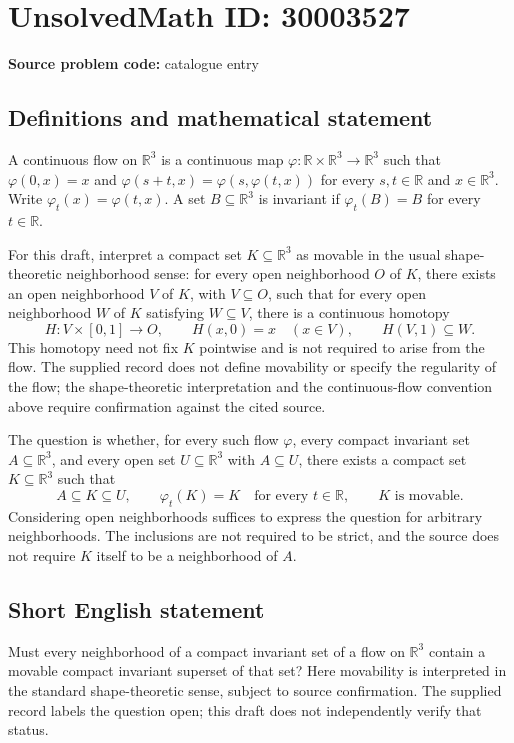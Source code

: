 \documentclass[11pt]{article}
\newcommand{\R}{\mathbb{R}}
\begin{document}
\section*{UnsolvedMath ID: 30003527}
\textbf{Source problem code:} catalogue entry
\subsection{Definitions and mathematical statement}
A continuous flow on \(\R^3\) is a continuous map \(\varphi:\R\times\R^3\to\R^3\) such that \(\varphi(0,x)=x\) and \(\varphi(s+t,x)=\varphi(s,\varphi(t,x))\) for every \(s,t\in\R\) and \(x\in\R^3\). Write \(\varphi_t(x)=\varphi(t,x)\). A set \(B\subseteq\R^3\) is invariant if \(\varphi_t(B)=B\) for every \(t\in\R\).

For this draft, interpret a compact set \(K\subseteq\R^3\) as movable in the usual shape-theoretic neighborhood sense: for every open neighborhood \(O\) of \(K\), there exists an open neighborhood \(V\) of \(K\), with \(V\subseteq O\), such that for every open neighborhood \(W\) of \(K\) satisfying \(W\subseteq V\), there is a continuous homotopy
\[
H:V\times[0,1]\longrightarrow O,
\qquad H(x,0)=x\quad(x\in V),
\qquad H(V,1)\subseteq W.
\]
This homotopy need not fix \(K\) pointwise and is not required to arise from the flow. The supplied record does not define movability or specify the regularity of the flow; the shape-theoretic interpretation and the continuous-flow convention above require confirmation against the cited source.

The question is whether, for every such flow \(\varphi\), every compact invariant set \(A\subseteq\R^3\), and every open set \(U\subseteq\R^3\) with \(A\subseteq U\), there exists a compact set \(K\subseteq\R^3\) such that
\[
A\subseteq K\subseteq U,\qquad
\varphi_t(K)=K\quad\text{for every }t\in\R,
\qquad K\text{ is movable}.
\]
Considering open neighborhoods suffices to express the question for arbitrary neighborhoods. The inclusions are not required to be strict, and the source does not require \(K\) itself to be a neighborhood of \(A\).
\subsection{Short English statement}
Must every neighborhood of a compact invariant set of a flow on \(\R^3\) contain a movable compact invariant superset of that set? Here movability is interpreted in the standard shape-theoretic sense, subject to source confirmation. The supplied record labels the question open; this draft does not independently verify that status.
\end{document}
